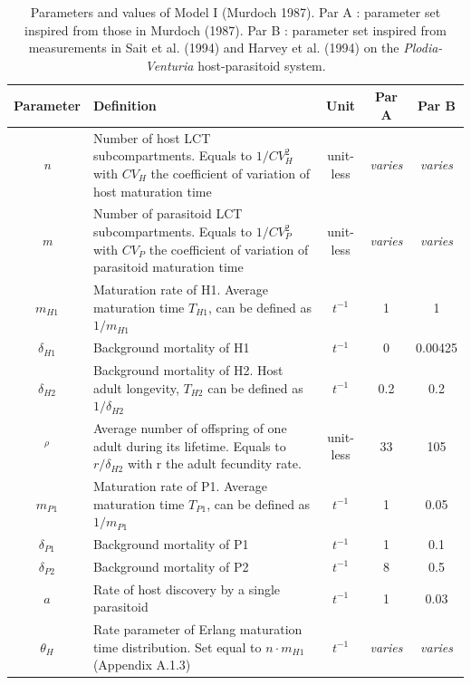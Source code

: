 \documentclass[12pt,a4paper,onecolumn]{article}
\begin{document}

\begin{table}[htb]
\centering
\footnotesize
\begin{tabularx}{\linewidth}{c >{\raggedright\arraybackslash}X c c c}
\toprule
Parameter & Definition & Unit & Par A & Par B \\

\midrule
\textit{n} & Number of host LCT subcompartments. Equals to $1/CV_H^2$ with $CV_H$ the
coefficient of variation of host maturation time & unit-less & \textit{varies} & \textit{varies} \\

\textit{m} & Number of parasitoid LCT subcompartments. Equals to $1/CV_P^2$ with $CV_P$ the
coefficient of variation of parasitoid maturation time & unit-less & \textit{varies} & \textit{varies} \\

$m_{H1}$ & Maturation rate of H1. Average maturation time  $T_{H1}$, can be defined as $1/m_{H1}$ & $t^{-1}$ & 1  & 1 \\

$\delta_{H1}$ & Background mortality of H1 & $t^{-1}$ & 0 & 0.00425 \\
$\delta_{H2}$ & Background mortality of H2. Host adult longevity, $T_{H2}$ can be defined as $1/\delta_{H2}$ & $t^{-1}$ &  0.2 & 0.2  \\
$^\rho$ & Average number of offspring of one adult during its lifetime. Equals to $r/\delta_{H2}$ with r the adult fecundity rate. & unit-less & 33 & 105 \\

$m_{P1}$ & Maturation rate of P1. Average maturation time  $T_{P1}$, can be defined as $1/m_{P1}$ & $t^{-1}$ & 1 & 0.05 \\
$\delta_{P1}$ & Background mortality of P1 & $t^{-1}$ & 1 & 0.1  \\
$\delta_{P2}$ & Background mortality of P2 & $t^{-1}$ & 8 & 0.5  \\
$a$ & Rate of host discovery by a single parasitoid & $t^{-1}$ & 1 & 0.03  \\

$\theta_H$ & Rate parameter of Erlang maturation time distribution. Set equal to $n \cdot m_{H1}$ (Appendix A.1.3) & $t^{-1}$ & \textit{varies}  & \textit{varies}   \\




\bottomrule
\end{tabularx}
\caption{Parameters and values of Model I (Murdoch 1987). Par A : parameter set inspired from those in Murdoch (1987). Par B : parameter set inspired from measurements in Sait et al. (1994) and Harvey et al. (1994) on the \textit{Plodia-Venturia} host-parasitoid system.}
\end{table}
\end{document}
